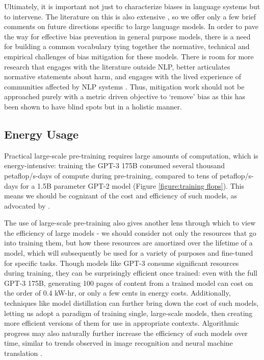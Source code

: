 \documentclass{article}
\begin{document}
Ultimately, it is important not just to characterize biases in language systems but to intervene. The literature on this is also extensive \cite{qian2019reducing,huang2019reducing}, so we offer only a few brief comments on future directions specific to large language models. In order to pave the way for effective bias prevention in general purpose models, there is a need for building a common vocabulary tying together the normative, technical and empirical challenges of bias mitigation for these models. There is room for more research that engages with the literature outside NLP, better articulates normative statements about harm, and engages with the lived experience of communities affected by NLP systems  \cite{blodgett2020language}. Thus, mitigation work should not be approached purely with a metric driven objective to `remove' bias as this has been shown to have blind spots \cite{gonen2019lipstick, nissim2019fair} but in a holistic manner.

    \subsection{Energy Usage}
    \label{section:Energy Usage}
Practical large-scale pre-training requires large amounts of computation, which is energy-intensive: training the GPT-3 175B consumed several thousand petaflop/s-days of compute during pre-training, compared to tens of petaflop/s-days for a 1.5B parameter GPT-2 model (Figure \ref{figure:training flops}). This means we should be cognizant of the cost and efficiency of such models, as advocated by \cite{schwartz2019}. 
   
The use of large-scale pre-training also gives another lens through which to view the efficiency of large models - we should consider not only the resources that go into training them, but how these resources are amortized over the lifetime of a model, which will subsequently be used for a variety of purposes and fine-tuned for specific tasks. Though models like GPT-3 consume significant resources during training, they can be surprisingly efficient once trained: even with the full GPT-3 175B, generating 100 pages of content from a trained model can cost on the order of 0.4 kW-hr, or only a few cents in energy costs. Additionally, techniques like model distillation \cite{liu2019improving} can further bring down the cost of such models, letting us adopt a paradigm of training single, large-scale models, then creating more efficient versions of them for use in appropriate contexts. Algorithmic progress may also naturally further increase the efficiency of such models over time, similar to trends observed in image recognition and neural machine translation \cite{hernandez2020}.
\end{document}
